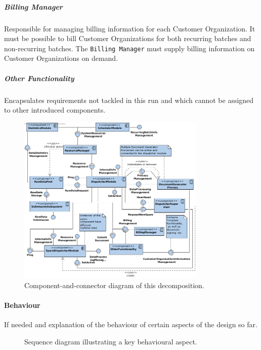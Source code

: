 \documentclass[a4paper,10pt]{article}
\begin{document}
\subparagraph{Billing Manager}
Responsible for managing billing information for each Customer Organization. It must be possible to bill Customer Organizations for both recurring batches and non-recurring batches. The \texttt{Billing Manager} must supply billing information on Customer Organizations on demand.

\subparagraph{Other Functionality}
Encapsulates requirements not tackled in this run and which cannot be
assigned to other introduced components.

\begin{figure}[!htp]
    \centering
    \includegraphics[width=0.8\textwidth]{comp_diag_1.png}
    \caption{Component-and-connector diagram of this decomposition.}\label{fig:it1-cc_main}
\end{figure}

\paragraph{Behaviour}
If needed and explanation of the behaviour of certain aspects of the design so
far.

\begin{figure}[!htp]
    \centering
    \caption{Sequence diagram illustrating a key behavioural aspect.
        }\label{fig:it1-seq_aspect1}
\end{figure}
\end{document}
